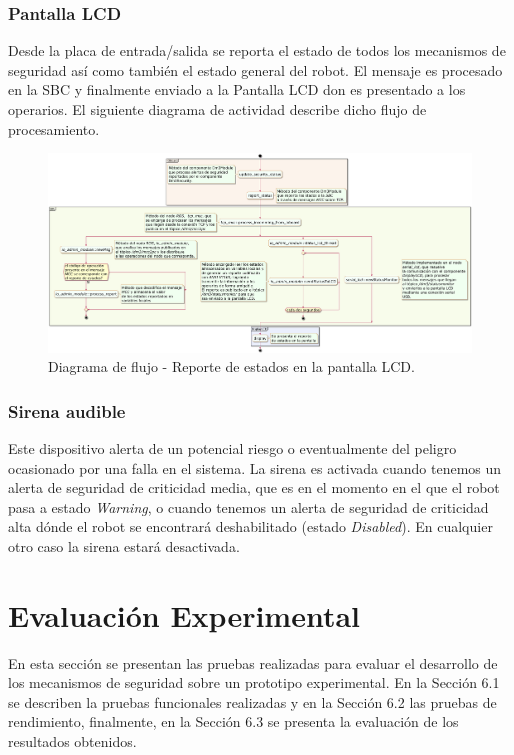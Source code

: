 \documentclass[withindex,glossary]{cam-thesis}
\begin{document}
\subsection{Pantalla LCD}
Desde la placa de entrada/salida se reporta el estado de todos los mecanismos de seguridad así como también el estado general del robot. El mensaje es procesado en la \gls{SBC} y finalmente enviado a la Pantalla LCD don es presentado a los operarios. El siguiente diagrama de actividad describe dicho flujo de procesamiento.

\begin{figure}[H]
\centering
\includegraphics[width=\textwidth]{images/Diagrama_de_flujo_indicadores_de_estados}
\caption[Diagrama de flujo - Indicadores de estados, pantalla LCD]{Diagrama de flujo - Reporte de estados en la pantalla LCD.}
\label{fig: Diagrama de flujo - Indicadores de estados Pantalla LCD}
\end{figure}

\subsection{Sirena audible}
Este dispositivo alerta de un potencial riesgo o eventualmente del peligro ocasionado por una falla en el sistema.
La sirena es activada cuando tenemos un alerta de seguridad de criticidad media, que es en el momento en el que el robot pasa a estado \textit{Warning}, o cuando tenemos un alerta de seguridad de criticidad alta dónde el robot se encontrará deshabilitado (estado \textit{Disabled}). En cualquier otro caso la sirena estará desactivada.
 
\chapter{Evaluación Experimental}
En esta sección se presentan las pruebas realizadas para evaluar el desarrollo de los mecanismos de seguridad sobre un prototipo experimental. En la Sección 6.1 se describen la pruebas funcionales realizadas y en la Sección 6.2 las pruebas de rendimiento, finalmente, en la Sección 6.3 se presenta la evaluación de los resultados obtenidos.
\end{document}

